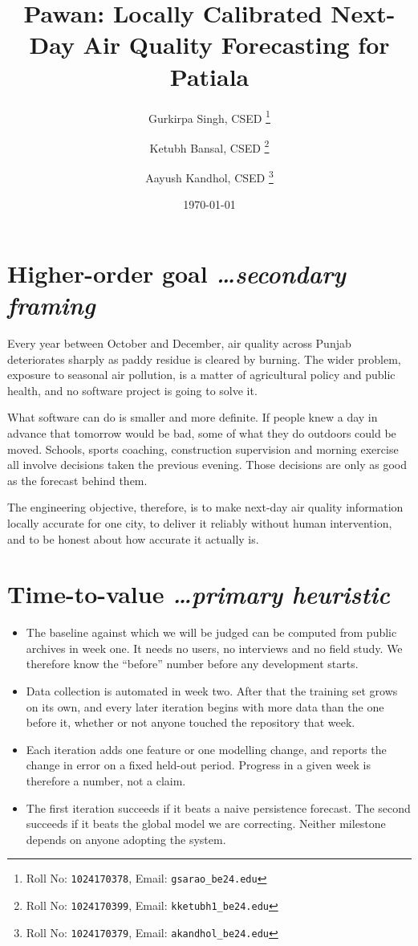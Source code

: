 \documentclass[11pt,a4paper]{article}
\title{Pawan: Locally Calibrated Next-Day Air Quality
  Forecasting for Patiala}
\author{
  Gurkirpa Singh, CSED%
  \thanks{Roll No: \texttt{1024170378}, %
    Email: \texttt{gsarao\_be24\@thapar.edu}}
  \and
  Ketubh Bansal, CSED%
  \thanks{Roll No: \texttt{1024170399}, %
    Email: \texttt{kketubh1\_be24\@thapar.edu}}
  \and
  Aayush Kandhol, CSED%
  \thanks{Roll No: \texttt{1024170379}, %
    Email: \texttt{akandhol\_be24\@thapar.edu}}
}
\date{\today}
\newcommand{\BvrHint}[1]{%
  {\normalfont\normalsize\itshape\hfill #1}}
\begin{document}
\maketitle

\section{Higher-order goal%
  \BvrHint{\ldots secondary framing}}
Every year between October and December, air quality
across Punjab deteriorates sharply as paddy residue is
cleared by burning. The wider problem, exposure to
seasonal air pollution, is a matter of agricultural
policy and public health, and no software project is
going to solve it.

What software can do is smaller and more definite. If
people knew a day in advance that tomorrow would be
bad, some of what they do outdoors could be moved.
Schools, sports coaching, construction supervision and
morning exercise all involve decisions taken the
previous evening. Those decisions are only as good as
the forecast behind them.

The engineering objective, therefore, is to make
next-day air quality information locally accurate for
one city, to deliver it reliably without human
intervention, and to be honest about how accurate it
actually is.

\section{Time-to-value %
\BvrHint{\ldots primary heuristic}}
\begin{itemize}[leftmargin=0.7cm]
  \item The baseline against which we will be judged can
    be computed from public archives in week one. It
    needs no users, no interviews and no field study. We
    therefore know the ``before'' number before any
    development starts.
  \item Data collection is automated in week two. After
    that the training set grows on its own, and every
    later iteration begins with more data than the one
    before it, whether or not anyone touched the
    repository that week.
  \item Each iteration adds one feature or one modelling
    change, and reports the change in error on a fixed
    held-out period. Progress in a given week is
    therefore a number, not a claim.
  \item The first iteration succeeds if it beats a naive
    persistence forecast. The second succeeds if it
    beats the global model we are correcting. Neither
    milestone depends on anyone adopting the system.
\end{itemize}
\end{document}
